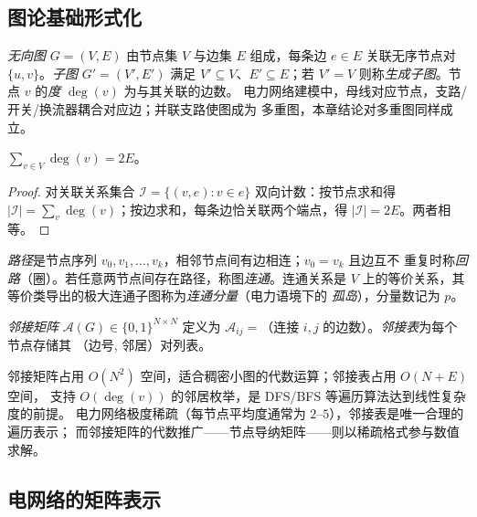 \subsection{图论基础形式化}\label{sec:gr-th-basics}

\begin{definition}[图、子图与度]
\emph{无向图} $G=(V,E)$ 由节点集 $V$ 与边集 $E$ 组成，每条边 $e\in E$ 关联无序节点对
$\{u,v\}$。\emph{子图} $G'=(V',E')$ 满足 $V'\subseteq V$、$E'\subseteq E$；若
$V'=V$ 则称\emph{生成子图}。节点 $v$ 的\emph{度} $\deg(v)$ 为与其关联的边数。
电力网络建模中，母线对应节点，支路/开关/换流器耦合对应边；并联支路使图成为
多重图，本章结论对多重图同样成立。
\end{definition}

\begin{lemma}[握手引理]\label{sec:gr-th-handshake}
$\sum_{v\in V}\deg(v)=2E$。
\end{lemma}
\begin{proof}
对关联关系集合 $\mathcal I=\{(v,e):v\in e\}$ 双向计数：按节点求和得
$|\mathcal I|=\sum_v\deg(v)$；按边求和，每条边恰关联两个端点，得
$|\mathcal I|=2E$。两者相等。
\end{proof}

\begin{definition}[路径、连通与连通分量]
\emph{路径}是节点序列 $v_0,v_1,\dots,v_k$，相邻节点间有边相连；$v_0=v_k$ 且边互不
重复时称\emph{回路}（圈）。若任意两节点间存在路径，称图\emph{连通}。连通关系是
$V$ 上的等价关系，其等价类导出的极大连通子图称为\emph{连通分量}（电力语境下的
\emph{孤岛}），分量数记为 $p$。
\end{definition}

\begin{definition}[邻接矩阵与邻接表]
\emph{邻接矩阵} $\mathcal A(G)\in\{0,1\}^{N\times N}$ 定义为
$\mathcal A_{ij}=$（连接 $i,j$ 的边数）。\emph{邻接表}为每个节点存储其
（边号, 邻居）对列表。
\end{definition}

\begin{remark}[表示法的选择]
邻接矩阵占用 $O(N^2)$ 空间，适合稠密小图的代数运算；邻接表占用 $O(N+E)$ 空间，
支持 $O(\deg(v))$ 的邻居枚举，是 DFS/BFS 等遍历算法达到线性复杂度的前提。
电力网络极度稀疏（每节点平均度通常为 $2$–$5$），邻接表是唯一合理的遍历表示；
而邻接矩阵的代数推广——节点导纳矩阵——则以稀疏格式参与数值求解。
\end{remark}

\subsection{电网络的矩阵表示}\label{sec:gr-th-network}

